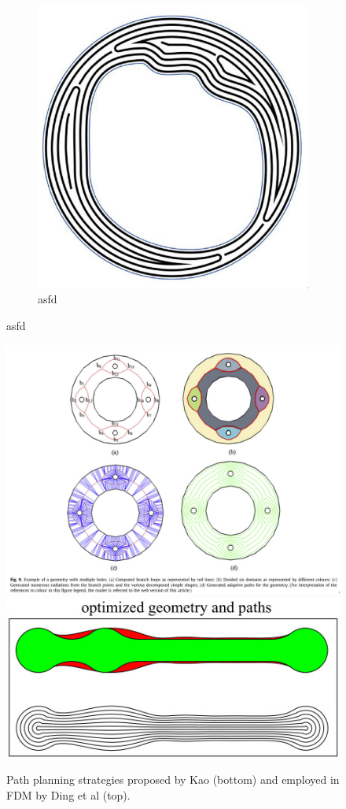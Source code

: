 \begin{figure}
\begin{subfigure}{0.45\columnwidth}
\includegraphics[width=\columnwidth]{sources/related_work/jin.jpg}
\caption{asfd}
\label{jin}
\end{subfigure}
\end{figure}

\begin{figure}
\centering
\includegraphics[width=\columnwidth]{sources/related_work/ding.jpg}
\includegraphics[width=.7\columnwidth]{sources/related_work/kao.jpg}
\caption{Path planning strategies proposed by Kao (bottom) and employed in FDM by Ding et al (top).}
\label{ding}
\end{figure}